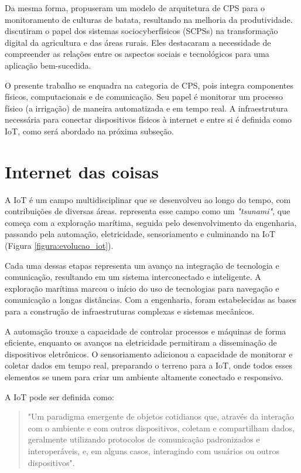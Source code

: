 Da mesma forma, \textcite{rad2015smart} propuseram um modelo de arquitetura de CPS para o monitoramento de culturas de batata, resultando na melhoria da produtividade. \textcite{rijswijk2021digital} discutiram o papel dos sistemas sociocyberfísicos (SCPSs) na transformação digital da agricultura e das áreas rurais. Eles destacaram a necessidade de compreender as relações entre os aspectos sociais e tecnológicos para uma aplicação bem-sucedida.

O presente trabalho se enquadra na categoria de CPS, pois integra componentes físicos, computacionais e de comunicação. Seu papel é monitorar um processo físico (a irrigação) de maneira automatizada e em tempo real. A infraestrutura necessária para conectar dispositivos físicos à internet e entre si é definida como IoT, como será abordado na próxima subseção. 

\section{Internet das coisas}
A IoT é um campo multidisciplinar que se desenvolveu ao longo do tempo, com contribuições de diversas áreas. \textcite{datta2017} representa esse campo como um \textit{"tsunami"}, que começa com a exploração marítima, seguida pelo desenvolvimento da engenharia, passando pela automação, eletricidade, sensoriamento e culminando na IoT (Figura \ref{figura:evolucao_iot}). 

Cada uma dessas etapas representa um avanço na integração de tecnologia e comunicação, resultando em um sistema interconectado e inteligente. A exploração marítima marcou o início do uso de tecnologias para navegação e comunicação a longas distâncias. Com a engenharia, foram estabelecidas as bases para a construção de infraestruturas complexas e sistemas mecânicos. 

A automação trouxe a capacidade de controlar processos e máquinas de forma eficiente, enquanto os avanços na eletricidade permitiram a disseminação de dispositivos eletrônicos. O sensoriamento adicionou a capacidade de monitorar e coletar dados em tempo real, preparando o terreno para a IoT, onde todos esses elementos se unem para criar um ambiente altamente conectado e responsivo.

A IoT pode ser definida como:

\begin{quote}
"Um paradigma emergente de objetos cotidianos que, através da interação com o ambiente e com outros dispositivos, coletam e compartilham dados, geralmente utilizando protocolos de comunicação padronizados e interoperáveis, e, em alguns casos, interagindo com usuários ou outros dispositivos". \parencite[{p. 44}]{kortuem2009things}
\end{quote}

